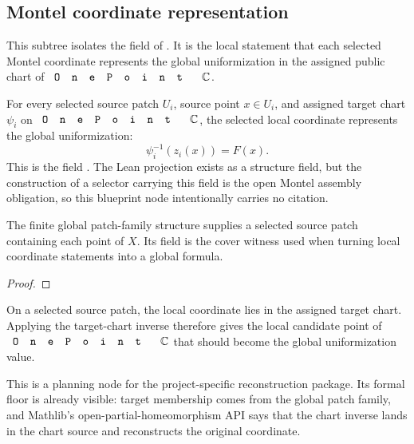 \subsection{Montel coordinate representation}
\label{sec:montel-coord-represents}

This subtree isolates the  field of
.  It is the local statement that
each selected Montel coordinate represents the global uniformization in the
assigned public chart of \(\code{OnePoint}\,\C\).

\begin{lemma}
\label{lem:montel-selector-coord-represents-uniformization}
For every selected source patch \(U_i\), source point \(x\in U_i\), and assigned
target chart \(\psi_i\) on \(\code{OnePoint}\,\C\), the selected local coordinate
represents the global uniformization:
\[
  \psi_i^{-1}(z_i(x)) = F(x).
\]
This is the field
.
The Lean projection exists as a structure field, but the construction of a
selector carrying this field is the open Montel assembly obligation, so this
blueprint node intentionally carries no  citation.
\end{lemma}

\begin{lemma}
\label{lem:montel-selector-source-patch-cover}
The finite global patch-family structure supplies a selected source patch
containing each point of \(X\).  Its  field is the cover
witness used when turning local coordinate statements into a global formula.
\leanok
\end{lemma}
\begin{proof}\leanok\end{proof}

\begin{lemma}
\label{lem:montel-selector-chart-inverse-local-value}
On a selected source patch, the local coordinate lies in the assigned target
chart.  Applying the target-chart inverse therefore gives the local candidate
point of \(\code{OnePoint}\,\C\) that should become the global uniformization
value.

This is a planning node for the project-specific reconstruction package.  Its
formal floor is already visible: target membership comes from the global patch
family, and Mathlib's open-partial-homeomorphism API says that the chart inverse
lands in the chart source and reconstructs the original coordinate.
\end{lemma}

